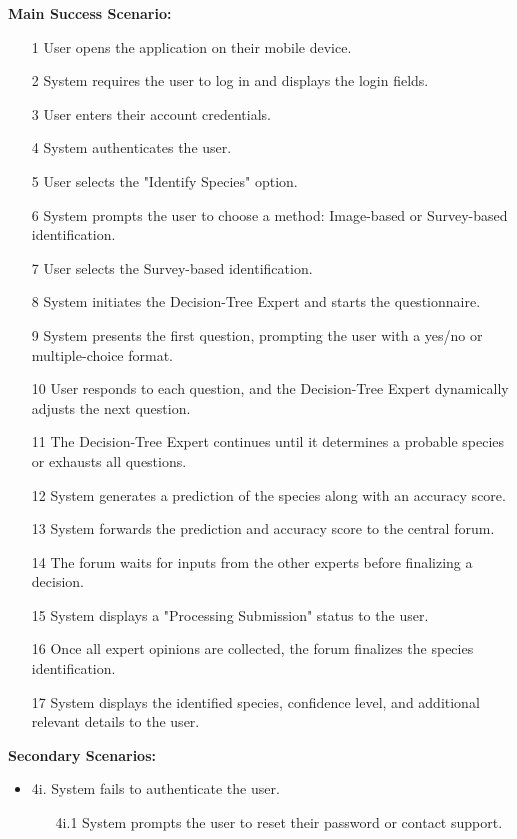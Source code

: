 \documentclass[]{article}
\begin{document}
\begin{enumerate}[{\bf BE1.}]
\begin{enumerate}[{\bf VP1.}]
        \textbf{Main Success Scenario:}
        \begin{enumerate}
            \item[1] User opens the application on their mobile device.
            \item[2] System requires the user to log in and displays the login fields.
            \item[3] User enters their account credentials.
            \item[4] System authenticates the user.
            \item[5] User selects the "Identify Species" option.
            \item[6] System prompts the user to choose a method: Image-based or Survey-based identification.
            \item[7] User selects the Survey-based identification.
            \item[8] System initiates the Decision-Tree Expert and starts the questionnaire.
            \item[9] System presents the first question, prompting the user with a yes/no or multiple-choice format.
            \item[10] User responds to each question, and the Decision-Tree Expert dynamically adjusts the next question.
            \item[11] The Decision-Tree Expert continues until it determines a probable species or exhausts all questions.
            \item[12] System generates a prediction of the species along with an accuracy score.
            \item[13] System forwards the prediction and accuracy score to the central forum.
            \item[14] The forum waits for inputs from the other experts before finalizing a decision.
            \item[15] System displays a "Processing Submission" status to the user.
            \item[16] Once all expert opinions are collected, the forum finalizes the species identification.
            \item[17] System displays the identified species, confidence level, and additional relevant details to the user.
        \end{enumerate}

        \textbf{Secondary Scenarios:}
        \begin{itemize}
            \item 4i. System fails to authenticate the user.
            \begin{enumerate}
                \item[4i.1] System prompts the user to reset their password or contact support.
            \end{enumerate}
            

\end{itemize}
\end{enumerate}
\end{enumerate}
\end{document}
